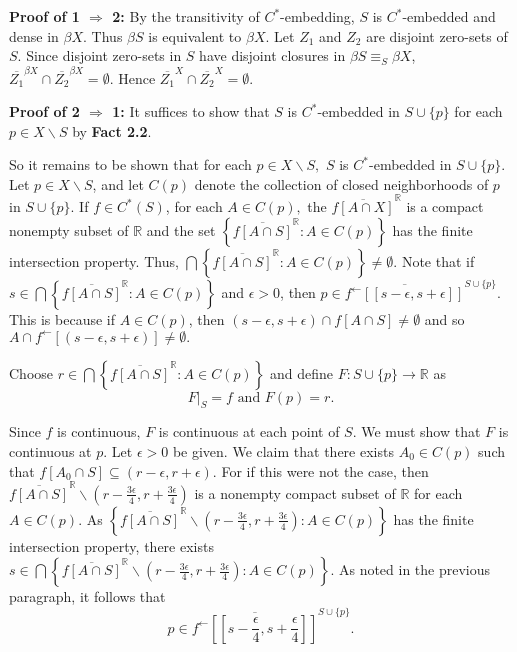 \documentclass{article}
\begin{document}
\vskip 10pt

\textbf{Proof of 1 $\Rightarrow$ 2: }  By the transitivity of $C^*$-embedding, $S$ is $C^*$-embedded and dense in $\beta X$. Thus $\beta S$ is equivalent to $\beta X$. Let $Z_1$ and $Z_2$ are disjoint zero-sets of $S$. Since disjoint zero-sets in $S$ have disjoint closures in $\beta S \equiv_S \beta X$, $\overline{Z_1}^{\beta X}\cap \overline{Z_2}^{\beta X}=\emptyset$. Hence $\overline{Z_1}^X\cap \overline{Z_2}^X=\emptyset$.


\vskip 20pt



\textbf{Proof of 2 $\Rightarrow$ 1: } It suffices to show that $S$ is $C^*$-embedded in $S\cup \{p\}$ for each $p\in X\backslash S$ by \textbf{Fact 2.2}.  


\vskip 15pt

So it remains to be shown that for each $p\in X\backslash S,$ $S$ is $C^*$-embedded in $S\cup \{p\}$. Let $p\in X\backslash S$, and let $C(p)$ denote the collection of closed neighborhoods of $p$ in $S\cup \{p\}.$ If $f\in C^*(S)$, for each $A\in C(p),$ the $\overline{f\left[A\cap X\right]}^{\mathbb{R}}$ is a compact nonempty subset of $\mathbb{R}$ and the set $\left\{\overline{f\left[A\cap S\right]}^{\mathbb{R}}: A\in C(p)\right\}$ has the finite intersection property. Thus,  $\bigcap\left\{\overline{f\left[A\cap S\right]}^{\mathbb{R}}: A\in C(p)\right\}\neq \emptyset$. Note that if $s\in \bigcap\left\{ \overline{f[A\cap S]}^{\mathbb{R}}: A\in C(p)\right\}$ and $\epsilon>0$, then $p\in \overline{f^\leftarrow \left[ [s-\epsilon, s+\epsilon]\right]}^{S\cup \{p\}}$. This is because if $A\in C(p)$, then $(s-\epsilon, s+\epsilon)\cap f[A\cap S]\neq \emptyset$ and so $A\cap f^\leftarrow \left[(s-\epsilon, s+\epsilon)\right]\neq \emptyset.$ 

\vskip 20pt
 
Choose $r\in \bigcap \left\{\overline{f[A\cap S]}^\mathbb{R}: A\in C(p)\right\}$ and define $F:S\cup \{p\} \rightarrow \mathbb{R}$ as
$$ F|_S=f \mbox{ and } F(p)=r.$$

Since $f$ is continuous, $F$ is continuous at each point of $S$. We must show that $F$ is continuous at $p$. Let $\epsilon>0$ be given.
We claim that there exists $A_0\in C(p)$ such that $f\left[A_0\cap S\right] \subseteq (r-\epsilon, r+\epsilon).$ For if this were not the case, then $\overline{f\left[A\cap S\right]}^{\mathbb{R}}\backslash (r-\frac{3\epsilon}{4}, r+\frac{3\epsilon}{4})$ is a nonempty compact subset of $\mathbb{R}$ for each $A\in C(p).$ As $\left\{\overline{f[A\cap S]}^{\mathbb{R}}\backslash (r-\frac{3\epsilon}{4}, r+\frac{3\epsilon}{4}): A\in C(p)\right\}$ has the finite intersection property, there exists $s\in \bigcap \left\{\overline{f[A\cap S]}^{\mathbb{R}}\backslash (r-\frac{3\epsilon}{4}, r+\frac{3\epsilon}{4}): A\in C(p)\right\}$. As noted in the previous paragraph, it follows that $$p\in \overline{f^\leftarrow\left[[s-\frac{\epsilon}{4},s+\frac{\epsilon}{4}]\right]}^{S\cup \{p\}}.$$
\end{document}
